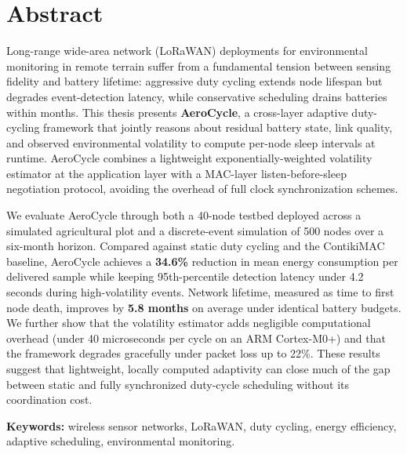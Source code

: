 \chapter*{Abstract}
\thispagestyle{plain}

\noindent Long-range wide-area network (LoRaWAN) deployments for environmental monitoring
in remote terrain suffer from a fundamental tension between sensing fidelity and battery
lifetime: aggressive duty cycling extends node lifespan but degrades event-detection
latency, while conservative scheduling drains batteries within months. This thesis presents
\textbf{AeroCycle}, a cross-layer adaptive duty-cycling framework that jointly reasons about
residual battery state, link quality, and observed environmental volatility to compute
per-node sleep intervals at runtime. AeroCycle combines a lightweight exponentially-weighted
volatility estimator at the application layer with a MAC-layer listen-before-sleep
negotiation protocol, avoiding the overhead of full clock synchronization schemes.

We evaluate AeroCycle through both a 40-node testbed deployed across a simulated agricultural
plot and a discrete-event simulation of 500 nodes over a six-month horizon. Compared against
static duty cycling and the ContikiMAC baseline, AeroCycle achieves a \textbf{34.6\%} reduction
in mean energy consumption per delivered sample while keeping 95th-percentile detection
latency under 4.2 seconds during high-volatility events. Network lifetime, measured as time
to first node death, improves by \textbf{5.8 months} on average under identical battery
budgets. We further show that the volatility estimator adds negligible computational overhead
(under 40 microseconds per cycle on an ARM Cortex-M0+) and that the framework degrades
gracefully under packet loss up to 22\%. These results suggest that lightweight, locally
computed adaptivity can close much of the gap between static and fully synchronized duty-cycle
scheduling without its coordination cost.

\vspace{10pt}
\noindent\textbf{Keywords:} wireless sensor networks, LoRaWAN, duty cycling, energy efficiency,
adaptive scheduling, environmental monitoring.

